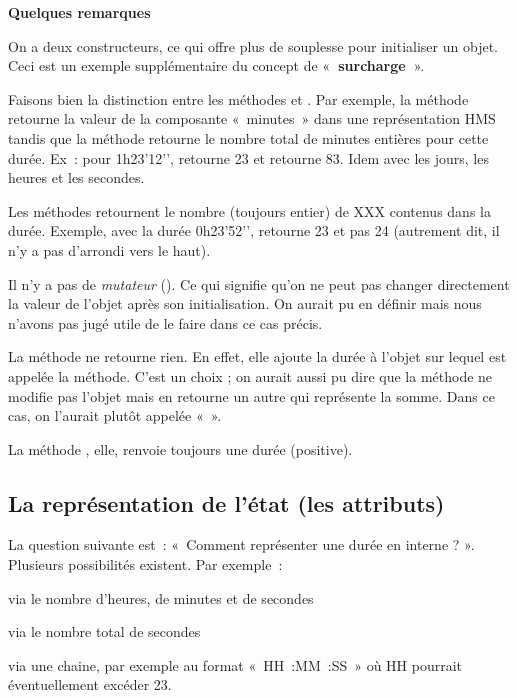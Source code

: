 		\textbf{Quelques remarques}
		\begin{liste}
			\item {
				On a deux constructeurs, ce qui offre plus de souplesse pour initialiser
				un objet. Ceci est un exemple supplémentaire du concept de
				«\textbf{~surcharge~}».}
			\item {
				Faisons bien la distinction entre les méthodes
				 et . Par
				exemple, la méthode  retourne la valeur
				de la composante «~minutes~» dans une représentation HMS tandis que la
				méthode  retourne le nombre total
				de minutes entières pour cette durée. Ex~: pour 1h23’12’’,
				 retourne 23 et
				 retourne 83. Idem avec 
				les jours, les heures	et les secondes.}
			\item {
				Les méthodes  retournent le nombre
				(toujours entier) de XXX contenus dans la durée. Exemple, avec la durée
				0h23’52'’, 
				retourne 23 et pas 24 (autrement dit, il n’y a pas d’arrondi vers le
				haut).}
			\item {
				Il n’y a pas de \textit{mutateur }(). Ce qui
				signifie qu’on ne peut pas changer directement la valeur de l’objet
				après son initialisation. On aurait pu en définir mais nous
				n'avons pas jugé utile de le faire dans ce cas
				précis.}
			\item {
				La méthode  ne retourne rien. En effet,
				elle ajoute la durée à l’objet sur lequel est appelée la méthode. C’est
				un choix ; on aurait aussi pu dire que la méthode ne modifie pas
				l’objet mais en retourne un autre qui représente la somme. Dans ce cas,
				on l’aurait plutôt appelée «~».}
			\item {
				La méthode , elle, renvoie toujours une
				durée (positive).}
		\end{liste}
	
	\subsection{La représentation de l'état (les attributs)}
	
		La question suivante est~: «~Comment représenter une durée en interne ?
		». Plusieurs possibilités existent. Par exemple~:	
		\begin{liste}
			\item 
				via le nombre d’heures, de minutes et de secondes
			\item 
				via le nombre total de secondes
			\item 
				via une chaine, par exemple au format «~HH~:MM~:SS~» où HH pourrait
				éventuellement excéder 23.
		\end{liste}
		
